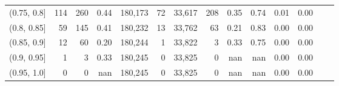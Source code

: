 \begin{tabular}{rrrrrrrrrrrrrr}
(0.75, 0.8]    &     114 &    260 &   0.44 &  180,173 &       72 &  33,617 &     208 &  0.35 &  0.74 &  0.01 &      0.00 \\
(0.8, 0.85]    &      59 &    145 &   0.41 &  180,232 &       13 &  33,762 &      63 &  0.21 &  0.83 &  0.00 &      0.00 \\
(0.85, 0.9]    &      12 &     60 &   0.20 &  180,244 &        1 &  33,822 &       3 &  0.33 &  0.75 &  0.00 &      0.00 \\
(0.9, 0.95]    &       1 &      3 &   0.33 &  180,245 &        0 &  33,825 &       0 &   nan &   nan &  0.00 &      0.00 \\
(0.95, 1.0]    &       0 &      0 &    nan &  180,245 &        0 &  33,825 &       0 &   nan &   nan &  0.00 &      0.00 \\
\bottomrule
\end{tabular}
